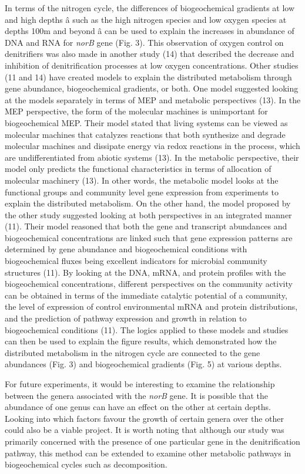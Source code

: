 \documentclass[11 pt,]{article}
\begin{document}
In terms of the nitrogen cycle, the differences of biogeochemical
gradients at low and high depths â such as the high nitrogen species
and low oxygen species at depths 100m and beyond â can be used to
explain the increases in abundance of DNA and RNA for \emph{norB} gene
(Fig. 3). This observation of oxygen control on denitrifiers was also
made in another study (14) that described the decrease and inhibition of
denitrification processes at low oxygen concentrations. Other studies
(11 and 14) have created models to explain the distributed metabolism
through gene abundance, biogeochemical gradients, or both. One model
suggested looking at the models separately in terms of MEP and metabolic
perspectives (13). In the MEP perspective, the form of the molecular
machines is unimportant for biogeochemical MEP. Their model stated that
living systems can be viewed as molecular machines that catalyzes
reactions that both synthesize and degrade molecular machines and
dissipate energy via redox reactions in the process, which are
undifferentiated from abiotic systems (13). In the metabolic
perspective, their model only predicts the functional characteristics in
terms of allocation of molecular machinery (13). In other words, the
metabolic model looks at the functional groups and community level gene
expression from experiments to explain the distributed metabolism. On
the other hand, the model proposed by the other study suggested looking
at both perspectives in an integrated manner (11). Their model reasoned
that both the gene and transcript abundances and biogeochemical
concentrations are linked such that gene expression patterns are
determined by gene abundance and biogeochemical conditions with
biogeochemical fluxes being excellent indicators for microbial community
structures (11). By looking at the DNA, mRNA, and protein profiles with
the biogeochemical concentrations, different perspectives on the
community activity can be obtained in terms of the immediate catalytic
potential of a community, the level of expression of control
environmental mRNA and protein distributions, and the prediction of
pathway expression and growth in relation to biogeochemical conditions
(11). The logics applied to these models and studies can then be used to
explain the figure results, which demonstrated how the distributed
metabolism in the nitrogen cycle are connected to the gene abundances
(Fig. 3) and biogeochemical gradients (Fig. 5) at various depths.

For future experiments, it would be interesting to examine the
relationship between the genera associated with the \emph{norB} gene. It
is possible that the abundance of one genus can have an effect on the
other at certain depths. Looking into which factors favour the growth of
certain genera over the other could also be a viable project. It is
worth noting that although our study was primarily concerned with the
presence of one particular gene in the denitrification pathway, this
method can be extended to examine other metabolic pathways in
biogeochemical cycles such as decomposition.
\end{document}
